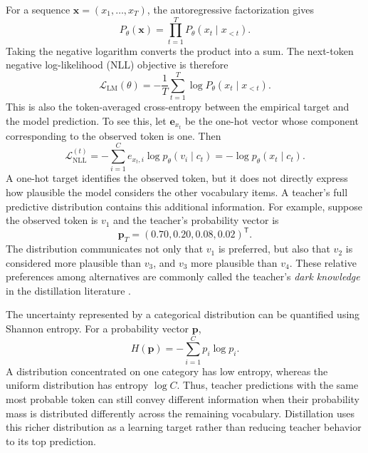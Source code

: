 For a sequence \(\mathbf x=(x_1,\ldots,x_T)\), the autoregressive
factorization gives
\begin{equation}
    P_\theta(\mathbf x)
    =\prod_{t=1}^{T}P_\theta(x_t\mid x_{<t}).
    \label{eq:distillation-autoregressive-factorization}
\end{equation}
Taking the negative logarithm converts the product into a sum.  The
next-token negative log-likelihood (NLL) objective is therefore
\begin{equation}
    \mathcal L_{\mathrm{LM}}(\theta)
    =-\frac{1}{T}\sum_{t=1}^{T}
    \log P_\theta(x_t\mid x_{<t}).
    \label{eq:distillation-nll}
\end{equation}
This is also the token-averaged cross-entropy between the empirical target
and the model prediction.  To see this, let \(\mathbf e_{x_t}\) be the
one-hot vector whose component corresponding to the observed token is one.
Then
\begin{equation}
    \mathcal L_{\mathrm{NLL}}^{(t)}
    =-\sum_{i=1}^{C}e_{x_t,i}
    \log p_\theta(v_i\mid c_t)
    =-\log p_\theta(x_t\mid c_t).
    \label{eq:distillation-one-hot-ce}
\end{equation}
A one-hot target identifies the observed token, but it does not directly
express how plausible the model considers the other vocabulary items.  A
teacher's full predictive distribution contains this additional information.
For example, suppose the observed token is \(v_1\) and the teacher's
probability vector is
\begin{equation}
    \mathbf p_T=(0.70,0.20,0.08,0.02)^{\mathsf T}.
    \label{eq:distillation-dark-knowledge-example}
\end{equation}
The distribution communicates not only that \(v_1\) is preferred, but
also that \(v_2\) is considered more plausible than \(v_3\), and
\(v_3\) more plausible than \(v_4\).  These relative preferences
among alternatives are commonly called the teacher's
\emph{dark knowledge} in the distillation literature
\parencite{Yang2024SurveyKD,Fang2026KnowledgeDatasetDistillation}.

The uncertainty represented by a categorical distribution can be quantified
using Shannon entropy.  For a probability vector \(\mathbf p\),
\begin{equation}
    H(\mathbf p)=-\sum_{i=1}^{C}p_i\log p_i.
    \label{eq:distillation-entropy}
\end{equation}
A distribution concentrated on one category has low entropy, whereas the
uniform distribution has entropy \(\log C\).  Thus, teacher predictions
with the same most probable token can still convey different information
when their probability mass is distributed differently across the remaining
vocabulary.  Distillation uses this richer distribution as a learning target
rather than reducing teacher behavior to its top prediction.

